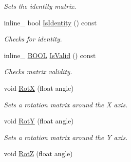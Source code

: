 \begin{DoxyCompactItemize}
\begin{DoxyCompactList}\small\item\em Sets the identity matrix. \end{DoxyCompactList}\item 
\hypertarget{class_matrix4x4_aff0d23c65c1d11697b0927386b5fe291}{inline\+\_\+ bool \hyperlink{class_matrix4x4_aff0d23c65c1d11697b0927386b5fe291}{Is\+Identity} () const }\label{class_matrix4x4_aff0d23c65c1d11697b0927386b5fe291}

\begin{DoxyCompactList}\small\item\em Checks for identity. \end{DoxyCompactList}\item 
\hypertarget{class_matrix4x4_a04f8868b9cb0673542cd7e6dfa6c3de0}{inline\+\_\+ \hyperlink{_ice_types_8h_a050c65e107f0c828f856a231f4b4e788}{B\+O\+O\+L} \hyperlink{class_matrix4x4_a04f8868b9cb0673542cd7e6dfa6c3de0}{Is\+Valid} () const }\label{class_matrix4x4_a04f8868b9cb0673542cd7e6dfa6c3de0}

\begin{DoxyCompactList}\small\item\em Checks matrix validity. \end{DoxyCompactList}\item 
\hypertarget{class_matrix4x4_af91a5889c63233947ab803f76d8c0937}{void \hyperlink{class_matrix4x4_af91a5889c63233947ab803f76d8c0937}{Rot\+X} (float angle)}\label{class_matrix4x4_af91a5889c63233947ab803f76d8c0937}

\begin{DoxyCompactList}\small\item\em Sets a rotation matrix around the X axis. \end{DoxyCompactList}\item 
\hypertarget{class_matrix4x4_a4b10603ffbb88969b0b889f5e695800e}{void \hyperlink{class_matrix4x4_a4b10603ffbb88969b0b889f5e695800e}{Rot\+Y} (float angle)}\label{class_matrix4x4_a4b10603ffbb88969b0b889f5e695800e}

\begin{DoxyCompactList}\small\item\em Sets a rotation matrix around the Y axis. \end{DoxyCompactList}\item 
\hypertarget{class_matrix4x4_a8effac9d4e833aef88c68a50186b54fa}{void \hyperlink{class_matrix4x4_a8effac9d4e833aef88c68a50186b54fa}{Rot\+Z} (float angle)}\label{class_matrix4x4_a8effac9d4e833aef88c68a50186b54fa}


\end{DoxyCompactItemize}
